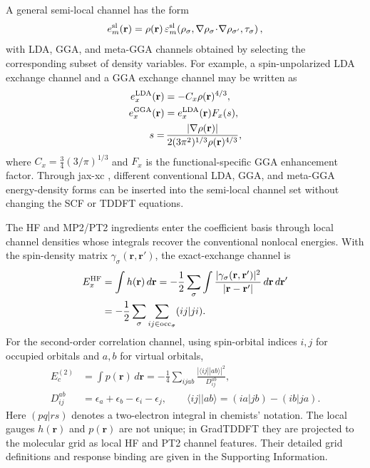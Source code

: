 A general semi-local channel has the form
\begin{equation}
  e_m^{\rm sl}(\mathbf{r})
  =
  \rho(\mathbf{r})\,
  \varepsilon_m^{\rm sl}
  \!\left(
    \rho_\sigma,
    \nabla\rho_\sigma\!\cdot\!\nabla\rho_{\sigma'},
    \tau_\sigma
  \right),
  \label{eq:semilocal-channel}
\end{equation}
with LDA, GGA, and meta-GGA channels obtained by selecting the
corresponding subset of density variables. For example, a
spin-unpolarized LDA exchange channel and a GGA exchange channel may
be written as
\begin{align}
  e_x^{\rm LDA}(\mathbf{r})
  &=
  -C_x\rho(\mathbf{r})^{4/3},
  \nonumber
  \\
  e_x^{\rm GGA}(\mathbf{r})
  &=
  e_x^{\rm LDA}(\mathbf{r})F_x(s),
  \nonumber
  \\
  s=
  &\,
  \frac{|\nabla\rho(\mathbf{r})|}
       {2(3\pi^2)^{1/3}\rho(\mathbf{r})^{4/3}},
  \label{eq:lda-gga-channel-example}
\end{align}
where $C_x=\frac{3}{4}(3/\pi)^{1/3}$ and $F_x$ is the
functional-specific GGA enhancement factor. Through jax-xc
\cite{JAXXC}, different conventional LDA, GGA, and meta-GGA
energy-density forms can be inserted into the semi-local channel set
without changing the SCF or TDDFT equations.

The HF and MP2/PT2 ingredients enter the coefficient basis through
local channel densities whose integrals recover the conventional
nonlocal energies.  With the spin-density matrix
$\gamma_\sigma(\mathbf{r},\mathbf{r}')$, the exact-exchange channel is
\begin{align}
  E_x^{\rm HF}
  &=
  \int h(\mathbf{r})\,d\mathbf{r}
  =
  -\frac{1}{2}
  \sum_\sigma
  \int
  \frac{
    |\gamma_\sigma(\mathbf{r},\mathbf{r}')|^2
  }{
    |\mathbf{r}-\mathbf{r}'|
  }
  \,d\mathbf{r}\,d\mathbf{r}'
  \nonumber
  \\
  &=
  -\frac{1}{2}
  \sum_{\sigma}
  \sum_{ij\in{\rm occ}_\sigma}
  (ij|ji).
  \label{eq:hf-energy-main}
\end{align}
For the second-order correlation channel, using spin-orbital indices
$i,j$ for occupied orbitals and $a,b$ for virtual orbitals,
\begin{align}
  E_c^{(2)}
  &=
  \int p(\mathbf{r})\,d\mathbf{r}
  =
  -\frac{1}{4}
  \sum_{ijab}
  \frac{
    |\langle ij||ab\rangle|^2
  }{
    D_{ij}^{ab}
  },
  \label{eq:pt2-energy-main}
  \\
  D_{ij}^{ab}
  &=
  \epsilon_a+\epsilon_b-\epsilon_i-\epsilon_j,
  \qquad
  \langle ij||ab\rangle=(ia|jb)-(ib|ja).
  \nonumber
\end{align}
Here $(pq|rs)$ denotes a two-electron integral in chemists'
notation.  The local gauges $h(\mathbf{r})$ and $p(\mathbf{r})$ are
not unique; in GradTDDFT they are projected to the molecular grid as
local HF and PT2 channel features.  Their detailed grid definitions
and response binding are given in the Supporting Information.

